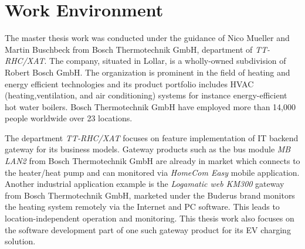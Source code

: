 
\section{Work Environment}

The master thesis work was conducted under the guidance of Nico Mueller and Martin Buschbeck from Bosch Thermotechnik GmbH, department of \emph{TT-RHC/XAT}. The company, situated in Lollar, is a wholly-owned subdivision of Robert Bosch GmbH.
The organization is prominent in the field of heating and energy efficient technologies and its product portfolio includes \textsc{HVAC} (heating,ventilation, and air conditioning) systems for instance energy-efficient hot water boilers. Bosch Thermotechnik GmbH have employed more than 14,000 people worldwide over 23 locations. 

The department \emph{TT-RHC/XAT} focuses on feature implementation of IT backend gateway for its business models. Gateway products such as the bus module \emph{MB LAN2} from Bosch Thermotechnik GmbH are already in market which connects to the heater/heat pump and can monitored via \emph{HomeCom Easy} mobile application. Another industrial application example is the \emph{Logamatic web KM300} gateway from Bosch Thermotechnik GmbH, marketed under the Buderus brand monitors the heating system remotely via the Internet and PC software. This leads to location-independent operation and monitoring. This thesis work also focuses on the software development part of one such gateway product for its \ac{EV} charging solution.


